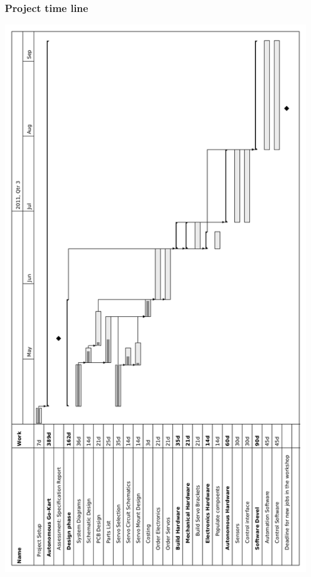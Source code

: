 \documentclass{beamer}
\begin{document}
\begin{frame}
\frametitle{Project time line}
    \begin{center}
      \includegraphics[angle=270,width=1.0\textwidth]{Images/Gantt}
    \end{center}
\end{frame}
\end{document}
